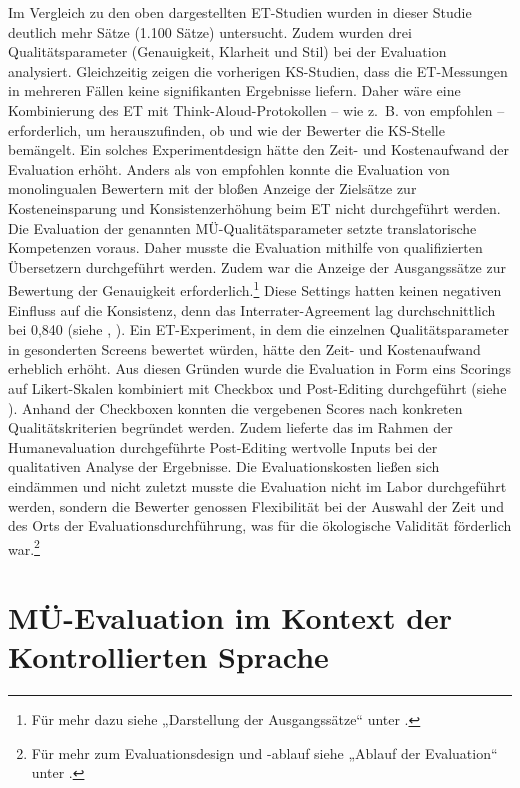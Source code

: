 Im Vergleich zu den oben dargestellten ET-Studien wurden in dieser Studie deutlich mehr Sätze (1.100 Sätze) untersucht. Zudem wurden drei Qualitätsparameter (Genauigkeit, Klarheit und Stil) bei der Evaluation analysiert. Gleichzeitig zeigen die vorherigen KS-Studien, dass die ET-Messungen in mehreren Fällen keine signifikanten Ergebnisse liefern. Daher wäre eine Kombinierung des ET mit Think-Aloud-Protokollen -- wie z.~B. von \citet{VanGogEtAl2009} empfohlen -- erforderlich, um herauszufinden, ob und wie der Bewerter die KS-Stelle bemängelt. Ein solches Experimentdesign hätte den Zeit- und Kostenaufwand der Evaluation erhöht. Anders als von \citet{GuzmánEtAl2015} empfohlen konnte die Evaluation von monolingualen Bewertern mit der bloßen Anzeige der Zielsätze zur Kosteneinsparung und Konsistenzerhöhung beim ET nicht durchgeführt werden. Die Evaluation der genannten MÜ-Qualitätsparameter setzte translatorische Kompetenzen voraus. Daher musste die Evaluation mithilfe von qualifizierten Übersetzern durchgeführt werden. Zudem war die Anzeige der Ausgangssätze zur Bewertung der Genauigkeit erforderlich.\footnote{\textrm{Für mehr dazu siehe „Darstellung der Ausgangssätze“ unter .}} Diese Settings hatten keinen negativen Einfluss auf die Konsistenz, denn das Interrater-Agreement lag durchschnittlich bei 0,840 (siehe , ). Ein ET-Experiment, in dem die einzelnen Qualitätsparameter in gesonderten Screens bewertet würden, hätte den Zeit- und Kostenaufwand erheblich erhöht. Aus diesen Gründen wurde die Evaluation in Form eins Scorings auf Likert-Skalen kombiniert mit Checkbox und Post-Editing durchgeführt (siehe ). Anhand der Checkboxen konnten die vergebenen Scores nach konkreten Qualitätskriterien begründet werden. Zudem lieferte das im Rahmen der Humanevaluation durchgeführte Post-Editing wertvolle Inputs bei der qualitativen Analyse der Ergebnisse. Die Evaluationskosten ließen sich eindämmen und nicht zuletzt musste die Evaluation nicht im Labor durchgeführt werden, sondern die Bewerter genossen Flexibilität bei der Auswahl der Zeit und des Orts der Evaluationsdurchführung, was für die ökologische Validität förderlich war.\footnote{\textrm{Für mehr zum Evaluationsdesign und -ablauf siehe „Ablauf der Evaluation“ unter .}}

\section{MÜ-Evaluation im Kontext der Kontrollierten Sprache}\label{sec:3.4}


